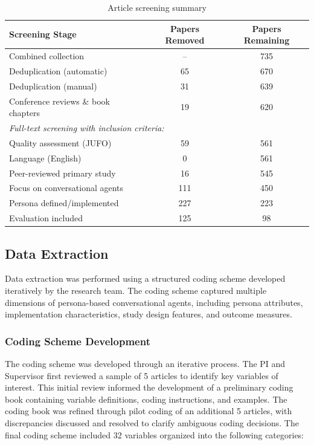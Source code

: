 \documentclass{article}
\begin{document}
\begin{table}[htbp]
\centering
\caption{Article screening summary}
\label{tab:screening_summary}
\begin{tabular}{lcc}
\hline
\textbf{Screening Stage} & \textbf{Papers Removed} & \textbf{Papers Remaining} \\
\hline
Combined collection & -- & 735 \\
Deduplication (automatic) & 65 & 670 \\
Deduplication (manual) & 31 & 639 \\
Conference reviews \& book chapters & 19 & 620 \\
\hline
\multicolumn{3}{l}{\textit{Full-text screening with inclusion criteria:}} \\
Quality assessment (JUFO) & 59 & 561 \\
Language (English) & 0 & 561 \\
Peer-reviewed primary study & 16 & 545 \\
Focus on conversational agents & 111 & 450 \\
Persona defined/implemented & 227 & 223 \\
Evaluation included & 125 & 98 \\
\hline
\end{tabular}
\end{table}

\subsection{Data Extraction}

Data extraction was performed using a structured coding scheme developed iteratively by the research team. The coding scheme captured multiple dimensions of persona-based conversational agents, including persona attributes, implementation characteristics, study design features, and outcome measures.

\subsubsection{Coding Scheme Development}

The coding scheme was developed through an iterative process. The PI and Supervisor first reviewed a sample of 5 articles to identify key variables of interest. This initial review informed the development of a preliminary coding book containing variable definitions, coding instructions, and examples. The coding book was refined through pilot coding of an additional 5 articles, with discrepancies discussed and resolved to clarify ambiguous coding decisions. The final coding scheme included 32 variables organized into the following categories:
\end{document}
